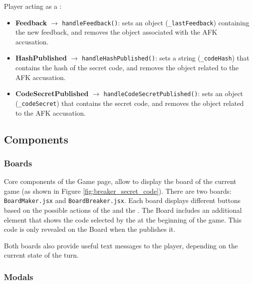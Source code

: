 {Player acting as a :
\ns\begin{itemize}
    \item \textbf{Feedback} $\rightarrow$ \texttt{handleFeedback()}: sets an object (\texttt{\_lastFeedback}) containing the new feedback, and removes the object associated with the AFK accusation.
    \item \textbf{HashPublished} $\rightarrow$ \texttt{handleHashPublished()}: sets a string (\texttt{\_codeHash}) that contains the hash of the secret code, and removes the object related to the AFK accusation.
    \item \textbf{CodeSecretPublished} $\rightarrow$ \texttt{handleCodeSecretPublished()}: sets an object (\texttt{\_codeSecret}) that contains the secret code, and removes the object related to the AFK accusation.
\end{itemize}}


\subsection{Components}

\subsubsection{Boards}

Core components of the Game page, allow to display the board of the current game (as shown in Figure \ref{fig:breaker_secret_code}). There are two boards: \texttt{BoardMaker.jsx} and \texttt{BoardBreaker.jsx}. Each board displays different buttons based on the possible actions of the  and the .
The  Board includes an additional element that shows the code selected by the  at the beginning of the game. This code is only revealed on the  Board when the  publishes it.

Both boards also provide useful text messages to the player, depending on the current state of the turn.

\subsubsection{Modals}

